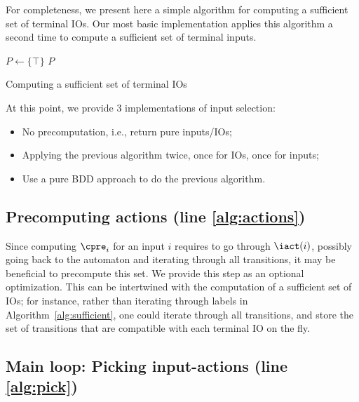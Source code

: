 \documentclass[sigconf,screen,nonacm]{acmart}
\begin{document}
For completeness, we present here a simple algorithm for computing a sufficient
set of terminal IOs.  Our most basic implementation applies this algorithm a
second time to compute a sufficient set of terminal inputs.

\begin{algorithm}

\BlankLine
\(P \leftarrow \{\top\}\)\;
\Return \(P\)
\caption{Computing a sufficient set of terminal IOs}
\label{alg:sufficient}
\end{algorithm}

At this point, we provide 3 implementations of input selection:
\begin{itemize}
\item No precomputation, i.e., return pure inputs/IOs;
\item Applying the previous algorithm twice, once for IOs, once for inputs;
\item Use a pure BDD approach to do the previous algorithm.
\end{itemize}

\subsection{Precomputing actions (line \ref{alg:actions})}

Since computing \(\cpre_i\) for an input \(i\) requires to go through
\(\iact(i)\), possibly going back to the automaton and iterating through all
transitions, it may be beneficial to precompute this set.  We provide this step
as an optional optimization.  This can be intertwined with the computation of a
sufficient set of IOs; for instance, rather than iterating through labels in
Algorithm~\ref{alg:sufficient}, one could iterate through all transitions, and
store the set of transitions that are compatible with each terminal IO on the
fly.

\subsection{Main loop: Picking input-actions (line \ref{alg:pick})}
\end{document}
